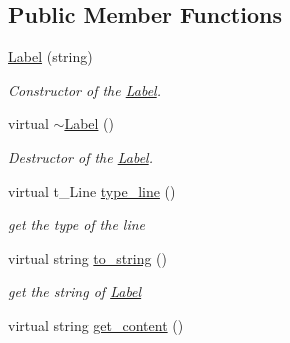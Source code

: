 \subsection*{Public Member Functions}
\begin{DoxyCompactItemize}
\item 
\hypertarget{classLabel_a48e774efc0e6e5cd0bf63a94527add17}{
\hyperlink{classLabel_a48e774efc0e6e5cd0bf63a94527add17}{Label} (string)}
\label{classLabel_a48e774efc0e6e5cd0bf63a94527add17}

\begin{DoxyCompactList}\small\item\em Constructor of the \hyperlink{classLabel}{Label}. \item\end{DoxyCompactList}\item 
\hypertarget{classLabel_ae0405d591a2ff63c03b104435e2a3066}{
virtual \hyperlink{classLabel_ae0405d591a2ff63c03b104435e2a3066}{$\sim$Label} ()}
\label{classLabel_ae0405d591a2ff63c03b104435e2a3066}

\begin{DoxyCompactList}\small\item\em Destructor of the \hyperlink{classLabel}{Label}. \item\end{DoxyCompactList}\item 
\hypertarget{classLabel_afc727d8ae97b32660faf703b30edc77e}{
virtual t\_\-Line \hyperlink{classLabel_afc727d8ae97b32660faf703b30edc77e}{type\_\-line} ()}
\label{classLabel_afc727d8ae97b32660faf703b30edc77e}

\begin{DoxyCompactList}\small\item\em get the type of the line \item\end{DoxyCompactList}\item 
\hypertarget{classLabel_a6df2e96366cc459a6a8fa9642a6e69b6}{
virtual string \hyperlink{classLabel_a6df2e96366cc459a6a8fa9642a6e69b6}{to\_\-string} ()}
\label{classLabel_a6df2e96366cc459a6a8fa9642a6e69b6}

\begin{DoxyCompactList}\small\item\em get the string of \hyperlink{classLabel}{Label} \item\end{DoxyCompactList}\item 
\hypertarget{classLabel_a8d48d53b6eb2c6024b7da507bfa5d00b}{
virtual string \hyperlink{classLabel_a8d48d53b6eb2c6024b7da507bfa5d00b}{get\_\-content} ()}
\label{classLabel_a8d48d53b6eb2c6024b7da507bfa5d00b}


\end{DoxyCompactItemize}
